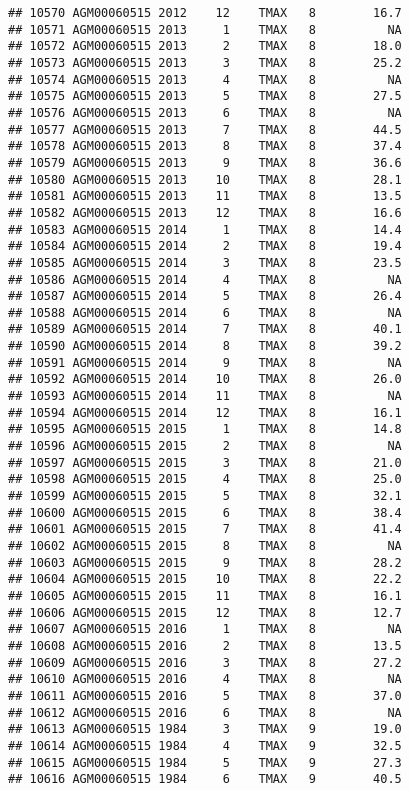 \documentclass{article}\usepackage[]{graphicx}\usepackage[]{color}
\makeatletter
\newenvironment{kframe}{%
 \def\at@end@of@kframe{}%
 \ifinner\ifhmode%
  \def\at@end@of@kframe{\end{minipage}}%
  \begin{minipage}{\columnwidth}%
 \fi\fi%
 \def\FrameCommand##1{\hskip\@totalleftmargin \hskip-\fboxsep
 \colorbox{shadecolor}{##1}\hskip-\fboxsep
     \hskip-\linewidth \hskip-\@totalleftmargin \hskip\columnwidth}%
 \MakeFramed {\advance\hsize-\width
   \@totalleftmargin\z@ \linewidth\hsize
   \@setminipage}}%
 {\par\unskip\endMakeFramed%
 \at@end@of@kframe}
\newenvironment{knitrout}{}{} %
\makeatother
\begin{document}
\begin{knitrout}
\begin{kframe}
\begin{verbatim}
## 10570 AGM00060515 2012    12    TMAX   8        16.7
## 10571 AGM00060515 2013     1    TMAX   8          NA
## 10572 AGM00060515 2013     2    TMAX   8        18.0
## 10573 AGM00060515 2013     3    TMAX   8        25.2
## 10574 AGM00060515 2013     4    TMAX   8          NA
## 10575 AGM00060515 2013     5    TMAX   8        27.5
## 10576 AGM00060515 2013     6    TMAX   8          NA
## 10577 AGM00060515 2013     7    TMAX   8        44.5
## 10578 AGM00060515 2013     8    TMAX   8        37.4
## 10579 AGM00060515 2013     9    TMAX   8        36.6
## 10580 AGM00060515 2013    10    TMAX   8        28.1
## 10581 AGM00060515 2013    11    TMAX   8        13.5
## 10582 AGM00060515 2013    12    TMAX   8        16.6
## 10583 AGM00060515 2014     1    TMAX   8        14.4
## 10584 AGM00060515 2014     2    TMAX   8        19.4
## 10585 AGM00060515 2014     3    TMAX   8        23.5
## 10586 AGM00060515 2014     4    TMAX   8          NA
## 10587 AGM00060515 2014     5    TMAX   8        26.4
## 10588 AGM00060515 2014     6    TMAX   8          NA
## 10589 AGM00060515 2014     7    TMAX   8        40.1
## 10590 AGM00060515 2014     8    TMAX   8        39.2
## 10591 AGM00060515 2014     9    TMAX   8          NA
## 10592 AGM00060515 2014    10    TMAX   8        26.0
## 10593 AGM00060515 2014    11    TMAX   8          NA
## 10594 AGM00060515 2014    12    TMAX   8        16.1
## 10595 AGM00060515 2015     1    TMAX   8        14.8
## 10596 AGM00060515 2015     2    TMAX   8          NA
## 10597 AGM00060515 2015     3    TMAX   8        21.0
## 10598 AGM00060515 2015     4    TMAX   8        25.0
## 10599 AGM00060515 2015     5    TMAX   8        32.1
## 10600 AGM00060515 2015     6    TMAX   8        38.4
## 10601 AGM00060515 2015     7    TMAX   8        41.4
## 10602 AGM00060515 2015     8    TMAX   8          NA
## 10603 AGM00060515 2015     9    TMAX   8        28.2
## 10604 AGM00060515 2015    10    TMAX   8        22.2
## 10605 AGM00060515 2015    11    TMAX   8        16.1
## 10606 AGM00060515 2015    12    TMAX   8        12.7
## 10607 AGM00060515 2016     1    TMAX   8          NA
## 10608 AGM00060515 2016     2    TMAX   8        13.5
## 10609 AGM00060515 2016     3    TMAX   8        27.2
## 10610 AGM00060515 2016     4    TMAX   8          NA
## 10611 AGM00060515 2016     5    TMAX   8        37.0
## 10612 AGM00060515 2016     6    TMAX   8          NA
## 10613 AGM00060515 1984     3    TMAX   9        19.0
## 10614 AGM00060515 1984     4    TMAX   9        32.5
## 10615 AGM00060515 1984     5    TMAX   9        27.3
## 10616 AGM00060515 1984     6    TMAX   9        40.5

\end{verbatim}
\end{kframe}
\end{knitrout}
\end{document}

